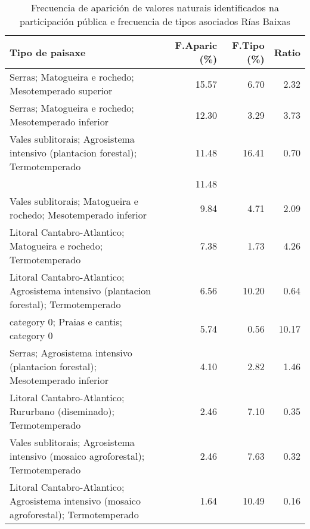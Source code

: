 \begin{table}[p]
\centering
\caption{Frecuencia de aparición de valores naturais identificados na participación pública e frecuencia de tipos asociados Rías Baixas} 
\label{vsixotnat12}
\begin{tabular}{lrrr}
  \hline
Tipo de paisaxe & F.Aparic (\%) & F.Tipo (\%) & Ratio \\ 
  \hline
Serras; Matogueira e rochedo; Mesotemperado superior & 15.57 & 6.70 & 2.32 \\ 
  Serras; Matogueira e rochedo; Mesotemperado inferior & 12.30 & 3.29 & 3.73 \\ 
  Vales sublitorais; Agrosistema intensivo (plantacion forestal); Termotemperado & 11.48 & 16.41 & 0.70 \\ 
   & 11.48 &  &  \\ 
  Vales sublitorais; Matogueira e rochedo; Mesotemperado inferior & 9.84 & 4.71 & 2.09 \\ 
  Litoral Cantabro-Atlantico; Matogueira e rochedo; Termotemperado & 7.38 & 1.73 & 4.26 \\ 
  Litoral Cantabro-Atlantico; Agrosistema intensivo (plantacion forestal); Termotemperado & 6.56 & 10.20 & 0.64 \\ 
  category 0; Praias e cantis; category 0 & 5.74 & 0.56 & 10.17 \\ 
  Serras; Agrosistema intensivo (plantacion forestal); Mesotemperado inferior & 4.10 & 2.82 & 1.46 \\ 
  Litoral Cantabro-Atlantico; Rururbano (diseminado); Termotemperado & 2.46 & 7.10 & 0.35 \\ 
  Vales sublitorais; Agrosistema intensivo (mosaico agroforestal); Termotemperado & 2.46 & 7.63 & 0.32 \\ 
  Litoral Cantabro-Atlantico; Agrosistema intensivo (mosaico agroforestal); Termotemperado & 1.64 & 10.49 & 0.16 \\ 
   \hline
\end{tabular}
\end{table}
